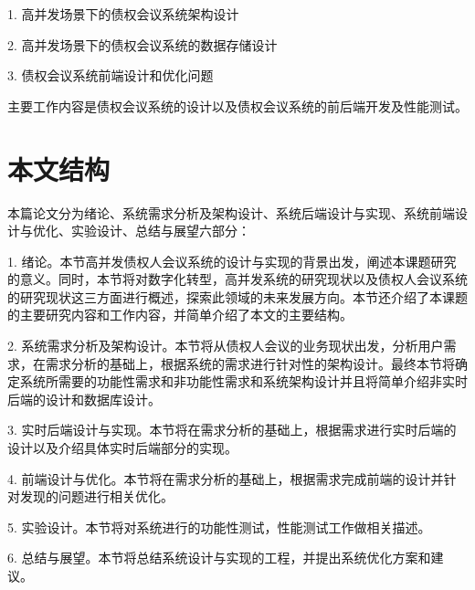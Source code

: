 1. 高并发场景下的债权会议系统架构设计

2. 高并发场景下的债权会议系统的数据存储设计

3. 债权会议系统前端设计和优化问题

主要工作内容是债权会议系统的设计以及债权会议系统的前后端开发及性能测试。

\section{本文结构}
本篇论文分为绪论、系统需求分析及架构设计、系统后端设计与实现、系统前端设计与优化、实验设计、总结与展望六部分：

1. 绪论。本节高并发债权人会议系统的设计与实现的背景出发，阐述本课题研究的意义。同时，本节将对数字化转型，高并发系统的研究现状以及债权人会议系统的研究现状这三方面进行概述，探索此领域的未来发展方向。本节还介绍了本课题的主要研究内容和工作内容，并简单介绍了本文的主要结构。

2. 系统需求分析及架构设计。本节将从债权人会议的业务现状出发，分析用户需求，在需求分析的基础上，根据系统的需求进行针对性的架构设计。最终本节将确定系统所需要的功能性需求和非功能性需求和系统架构设计并且将简单介绍非实时后端的设计和数据库设计。

3. 实时后端设计与实现。本节将在需求分析的基础上，根据需求进行实时后端的设计以及介绍具体实时后端部分的实现。

4. 前端设计与优化。本节将在需求分析的基础上，根据需求完成前端的设计并针对发现的问题进行相关优化。

5. 实验设计。本节将对系统进行的功能性测试，性能测试工作做相关描述。

6. 总结与展望。本节将总结系统设计与实现的工程，并提出系统优化方案和建议。

